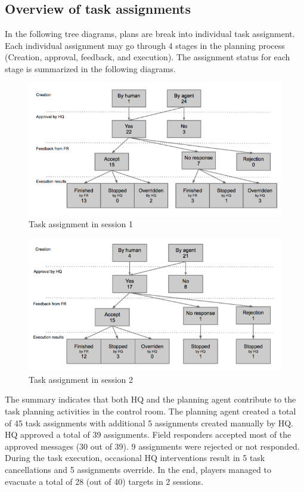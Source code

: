 \subsection{Overview of task assignments}
In the following tree diagrams, plans are break into individual task assignment. Each individual assignment may go through 4 stages in the planning process (Creation, approval, feedback, and execution). The assignment status for each stage is summarized in the following diagrams. \\

\begin{figure}[ht]
 \includegraphics[width=1\textwidth]{img/study3/TaskAsSession1}
\caption{Task assignment in session 1}
\label{fig:TaskAsSession1}
\end{figure}

\begin{figure}[ht]
 \includegraphics[width=1\textwidth]{img/study3/TaskAsSession2}
\caption{Task assignment in session 2}
\label{fig:TaskAsSession2}
\end{figure}

The summary indicates that both HQ and the planning agent contribute to the task planning activities in the control room. The planning agent created a total of 45 task assignments with additional 5 assignments created manually by HQ. HQ approved a total of 39 assignments. Field responders accepted most of the approved messages (30 out of 39). 9 assignments were rejected or not responded. During the task execution, occasional HQ interventions result in 5 task cancellations and 5 assignments override. In the end, players managed to evacuate a total of 28 (out of 40) targets in 2 sessions.\\ 

